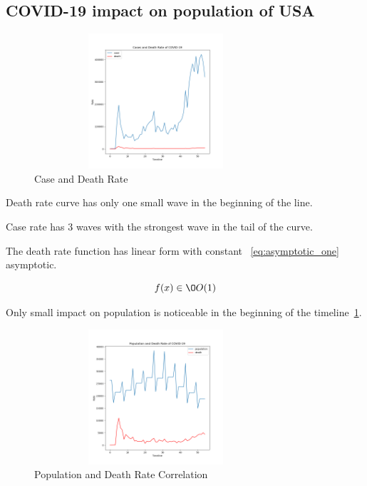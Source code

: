 \subsection{COVID-19 impact on population of USA}
\label{subsec:covid-19-impact-on-population-of-usa}

\begin{figure}[h]
    \includegraphics*[width=9cm, height=5cm]{../src/output/cases_and_death_diff.png}
    \caption{Case and Death Rate}
    \label{fig:cases_death_corr}
\end{figure}

Death rate curve has only one small wave in the beginning of the line.

Case rate has 3 waves with the strongest wave in the tail of the curve.

The death rate function has linear form with constant ~\ref{eq:asymptotic_one} asymptotic.

\begin{equation}
    f(x) \in \O O(1)
    \label{eq:asymptotic_one}
\end{equation}

Only small impact on population is noticeable in the beginning of the timeline~\ref{fig:cases_death_corr}.

\begin{figure}[h]
    \includegraphics*[width=9cm, height=5cm]{../src/output/population_and_death_diff.png}
    \caption{Population and Death Rate Correlation}
    \label{fig:pop_death_corr}
\end{figure}

